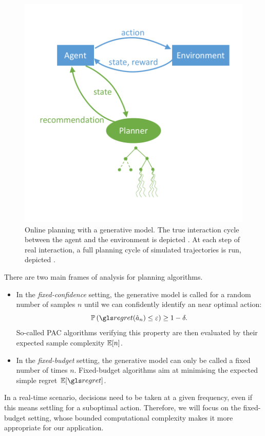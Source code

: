 \begin{figure}[ht]
	\centering
	\includegraphics[trim = {0 1.3cm 0 1.3cm}, clip, width=0.7\linewidth]{img/online_planning}
	\caption{Online planning with a generative model. The true interaction cycle between the agent and the environment is depicted . At each step of real interaction, a full planning cycle of simulated trajectories is run, depicted .}
	\label{fig:online-planning}
\end{figure}

There are two main frames of analysis for planning algorithms. 
\begin{itemize}
\item In the \emph{fixed-confidence} setting, the generative model is called for a random number of samples $n$ until we can confidently identify an near optimal action:
\begin{equation*}
\probability{\regret(\hat{a}_n) \leq \epsilon} \geq 1-\delta.
\end{equation*}
So-called \gls{PAC} algorithms verifying this property are then evaluated by their expected sample complexity $\operatorname*{\mathbb{E}} [n]$.
\item In the \emph{fixed-budget} setting, the generative model can only be called a fixed number of times $n$. Fixed-budget algorithms aim at minimising the expected simple regret $\expectedvalue[\regret]$.
\end{itemize}
In a real-time scenario, decisions need to be taken at a given frequency, even if this means settling for a suboptimal action. Therefore, we will focus on the fixed-budget setting, whose bounded computational complexity makes it more appropriate for our application.


